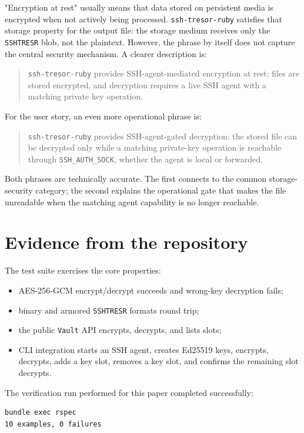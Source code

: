 \documentclass[11pt]{article}
\theoremstyle{definition}
\theoremstyle{plain}
\newcommand{\Project}{\texttt{ssh-tresor-ruby}}
\newcommand{\Tresor}{\texttt{SSHTRESR}}
\begin{document}
"Encryption at rest" usually means that data stored on persistent media is encrypted when not actively being processed. \Project{} satisfies that storage property for the output file: the storage medium receives only the \Tresor{} blob, not the plaintext. However, the phrase by itself does not capture the central security mechanism. A clearer description is:

\begin{quote}
\Project{} provides SSH-agent-mediated encryption at rest: files are stored encrypted, and decryption requires a live SSH agent with a matching private key operation.
\end{quote}

For the user story, an even more operational phrase is:

\begin{quote}
\Project{} provides SSH-agent-gated decryption: the stored file can be decrypted only while a matching private-key operation is reachable through \texttt{SSH\_AUTH\_SOCK}, whether the agent is local or forwarded.
\end{quote}

Both phrases are technically accurate. The first connects to the common storage-security category; the second explains the operational gate that makes the file unreadable when the matching agent capability is no longer reachable.

\section{Evidence from the repository}

The test suite exercises the core properties:

\begin{itemize}[leftmargin=*]
  \item AES-256-GCM encrypt/decrypt succeeds and wrong-key decryption fails;
  \item binary and armored \Tresor{} formats round trip;
  \item the public \texttt{Vault} API encrypts, decrypts, and lists slots;
  \item CLI integration starts an SSH agent, creates Ed25519 keys, encrypts, decrypts, adds a key slot, removes a key slot, and confirms the remaining slot decrypts.
\end{itemize}

The verification run performed for this paper completed successfully:

\begin{lstlisting}[style=textcode]
bundle exec rspec
10 examples, 0 failures
\end{lstlisting}
\end{document}
